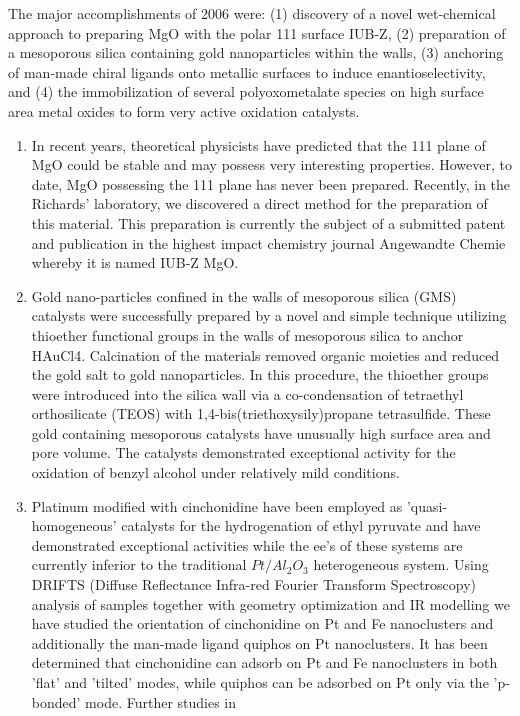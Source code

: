The major accomplishments of 2006 were: (1) discovery of a novel
wet-chemical approach to preparing MgO with the polar 111 surface
IUB-Z, (2) preparation of a mesoporous silica containing gold
nanoparticles within the walls, (3) anchoring of man-made chiral
ligands onto metallic surfaces to induce enantioselectivity, and
(4) the immobilization of several polyoxometalate species on high
surface area metal oxides to form very active oxidation catalysts.
\begin{enumerate}
\item In recent years, theoretical physicists have predicted that
the 111 plane of MgO could be stable and may possess very
interesting properties.  However, to date, MgO possessing the 111
plane has never been prepared.  Recently, in the Richards'
laboratory, we discovered a direct method for the preparation of
this material. This preparation is currently the subject of a
submitted patent and publication in the highest impact chemistry
journal Angewandte Chemie whereby it is named IUB-Z MgO. \item
Gold nano-particles confined in the walls of mesoporous silica
(GMS) catalysts were successfully prepared by a novel and simple
technique utilizing thioether functional groups in the walls of
mesoporous silica to anchor HAuCl4. Calcination of the materials
removed organic moieties and reduced the gold salt to gold
nanoparticles. In this procedure, the thioether groups were
introduced into the silica wall via a co-condensation of
tetraethyl orthosilicate (TEOS) with 1,4-bis(triethoxysily)propane
tetrasulfide. These gold containing mesoporous catalysts have
unusually high surface area and pore volume. The catalysts
demonstrated exceptional activity for the oxidation of benzyl
alcohol under relatively mild conditions. \item Platinum modified
with cinchonidine have been employed as 'quasi-homogeneous'
catalysts for the hydrogenation of ethyl pyruvate and have
demonstrated exceptional activities while the ee's of these
systems are currently inferior to the traditional $Pt/Al_2O_3$
heterogeneous system. Using DRIFTS (Diffuse Reflectance Infra-red
Fourier Transform Spectroscopy) analysis of samples together with
geometry optimization and IR modelling we have studied the
orientation of cinchonidine on Pt and Fe nanoclusters and
additionally the man-made ligand quiphos on Pt nanoclusters. It
has been determined that cinchonidine can adsorb on Pt and Fe
nanoclusters in both 'flat' and 'tilted' modes, while quiphos can
be adsorbed on Pt only via the 'p-bonded' mode. Further studies in

\end{enumerate}

